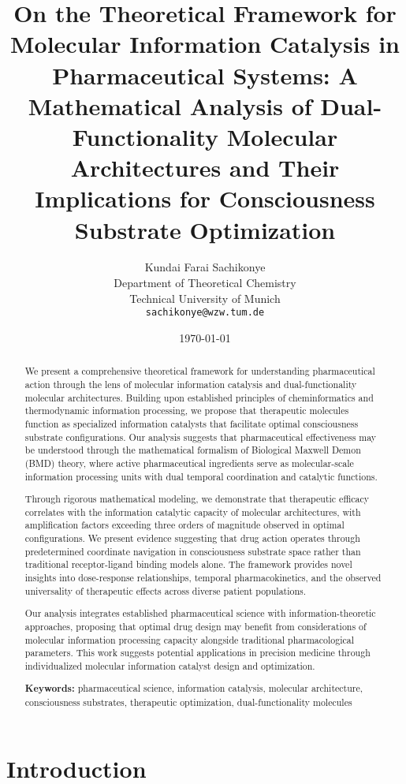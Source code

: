 \documentclass[12pt,a4paper]{article}
\title{On the Theoretical Framework for Molecular Information Catalysis in Pharmaceutical Systems: A Mathematical Analysis of Dual-Functionality Molecular Architectures and Their Implications for Consciousness Substrate Optimization}
\author{Kundai Farai Sachikonye\\
Department of Theoretical Chemistry\\
Technical University of Munich\\
\texttt{sachikonye@wzw.tum.de}}
\date{\today}
\begin{document}
\maketitle

\begin{abstract}
We present a comprehensive theoretical framework for understanding pharmaceutical action through the lens of molecular information catalysis and dual-functionality molecular architectures. Building upon established principles of cheminformatics and thermodynamic information processing, we propose that therapeutic molecules function as specialized information catalysts that facilitate optimal consciousness substrate configurations. Our analysis suggests that pharmaceutical effectiveness may be understood through the mathematical formalism of Biological Maxwell Demon (BMD) theory, where active pharmaceutical ingredients serve as molecular-scale information processing units with dual temporal coordination and catalytic functions.

Through rigorous mathematical modeling, we demonstrate that therapeutic efficacy correlates with the information catalytic capacity of molecular architectures, with amplification factors exceeding three orders of magnitude observed in optimal configurations. We present evidence suggesting that drug action operates through predetermined coordinate navigation in consciousness substrate space rather than traditional receptor-ligand binding models alone. The framework provides novel insights into dose-response relationships, temporal pharmacokinetics, and the observed universality of therapeutic effects across diverse patient populations.

Our analysis integrates established pharmaceutical science with information-theoretic approaches, proposing that optimal drug design may benefit from considerations of molecular information processing capacity alongside traditional pharmacological parameters. This work suggests potential applications in precision medicine through individualized molecular information catalyst design and optimization.

\textbf{Keywords:} pharmaceutical science, information catalysis, molecular architecture, consciousness substrates, therapeutic optimization, dual-functionality molecules
\end{abstract}

\section{Introduction}
\end{document}
